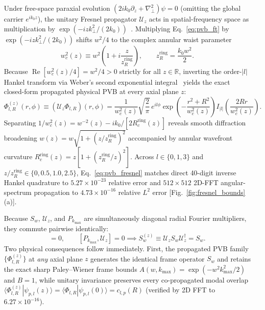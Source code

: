 \documentclass{optica-article}
\newcommand{\braket}[2]{\langle #1 | #2 \rangle}
\newcommand{\abs}[1]{\lvert #1 \rvert}
\begin{document}
Under free-space paraxial evolution $(2ik_0\partial_z + \nabla_\perp^2)\psi = 0$ (omitting the global carrier $e^{ik_0 z}$), the unitary Fresnel propagator $\mathcal{U}_z$ acts in spatial-frequency space as multiplication by $\exp(-iz k_\perp^2/(2k_0))$~\cite{Goodman2017}. Multiplying Eq.~\eqref{eq:pvb_ft} by $\exp(-iz k_\perp^2/(2k_0))$ shifts $w^2/4$ to the complex annular waist parameter
\begin{equation}
  w_c^2(z) \equiv w^2\!\left(1 + i\frac{z}{z_R^{\mathrm{ring}}}\right), \qquad z_R^{\mathrm{ring}} = \frac{k_0 w^2}{2}.
  \label{eq:wc_z}
\end{equation}
Because $\operatorname{Re}[w_c^2(z)/4] = w^2/4 > 0$ strictly for all $z \in \mathbb{R}$, inverting the order-$\abs{l}$ Hankel transform via Weber's second exponential integral~\cite{Gradshteyn2014} yields the exact closed-form propagated physical PVB at every axial plane $z$:
\begin{equation}
  \Phi_{l,R}^{(z)}(r,\phi) \equiv (\mathcal{U}_z\Phi_{l,R})(r,\phi) = \frac{1}{w_c^2(z)}\sqrt{\frac{2}{\pi}}\,e^{il\phi}\exp\!\left(-\frac{r^2 + R^2}{w_c^2(z)}\right) I_{\abs{l}}\!\left(\frac{2Rr}{w_c^2(z)}\right).
  \label{eq:pvb_fresnel}
\end{equation}
Separating $1/w_c^2(z) = w^{-2}(z) - i k_0/[2R_c^{\mathrm{ring}}(z)]$ reveals smooth diffraction broadening $w(z) = w\sqrt{1 + (z/z_R^{\mathrm{ring}})^2}$ accompanied by annular wavefront curvature $R_c^{\mathrm{ring}}(z) = z[1 + (z_R^{\mathrm{ring}}/z)^2]$. Across $l \in \{0,1,3\}$ and $z/z_R^{\mathrm{ring}} \in \{0, 0.5, 1.0, 2.5\}$, Eq.~\eqref{eq:pvb_fresnel} matches direct 40-digit inverse Hankel quadrature to $5.27\times 10^{-23}$ relative error and $512\times 512$ 2D-FFT angular-spectrum propagation to $4.73\times 10^{-16}$ relative $L^2$ error [Fig.~\ref{fig:fresnel_bounds}(a)].

Because $S_w$, $\mathcal{U}_z$, and $P_{k_{\max}}$ are simultaneously diagonal radial Fourier multipliers, they commute pairwise identically:
\begin{equation}
  [S_w, \mathcal{U}_z] = 0, \qquad [P_{k_{\max}}, \mathcal{U}_z] = 0 \implies S_w^{(z)} \equiv \mathcal{U}_z S_w \mathcal{U}_z^\dagger = S_w.
  \label{eq:fresnel_commute}
\end{equation}
Two physical consequences follow immediately. First, the propagated PVB family $\{\Phi_{l,R}^{(z)}\}$ at \emph{any} axial plane $z$ generates the identical frame operator $S_w$ and retains the exact sharp Paley--Wiener frame bounds $A(w,k_{\max}) = \exp(-w^2 k_{\max}^2/2)$ and $B = 1$, while unitary invariance preserves every co-propagated modal overlap $\braket{\Phi_{l,R}^{(z)}}{\psi_{p,l}(z)} = \braket{\Phi_{l,R}}{\psi_{p,l}(0)} = c_{l,p}(R)$ (verified by 2D FFT to $6.27\times 10^{-16}$).
\end{document}
